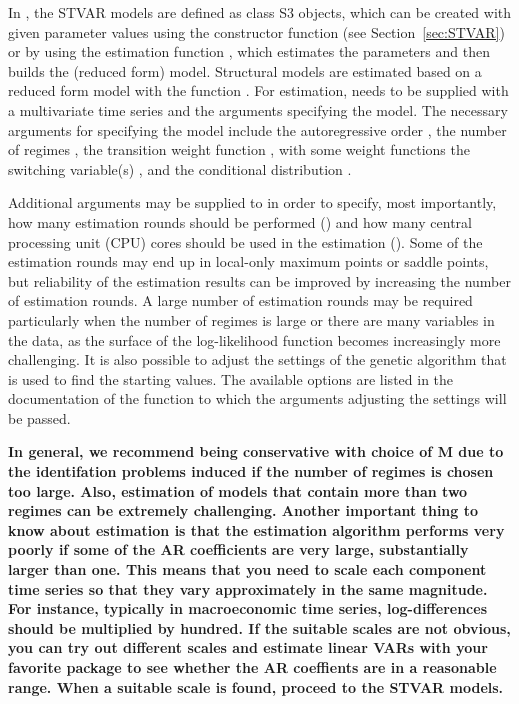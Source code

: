 \documentclass[nojss]{jss}
\begin{document}
In , the STVAR models are defined as class  S3 objects, which can be created with given parameter values using the constructor function  (see Section~\ref{sec:STVAR}) or by using the estimation function , which estimates the parameters and then builds the (reduced form) model. Structural models are estimated based on a reduced form model with the function . For estimation,  needs to be supplied with a multivariate time series and the arguments specifying the model. The necessary arguments for specifying the model include the autoregressive order , the number of regimes , the transition weight function , with some weight functions the switching variable(s) , and the conditional distribution .

Additional arguments may be supplied to  in order to specify, most importantly, how many estimation rounds should be performed () and how many central processing unit (CPU) cores should be used in the estimation (). Some of the estimation rounds may end up in local-only maximum points or saddle points, but reliability of the estimation results can be improved by increasing the number of estimation rounds. A large number of estimation rounds may be required particularly when the number of regimes is large or there are many variables in the data, as the surface of the log-likelihood function becomes increasingly more challenging. It is also possible to adjust the settings of the genetic algorithm that is used to find the starting values. The available options are listed in the documentation of the function  to which the arguments adjusting the settings will be passed.

\textbf{In general, we recommend being conservative with choice of M due to the identifation problems induced if the number of regimes is chosen too large. Also, estimation of models that contain more than two regimes can be extremely challenging. Another important thing to know about estimation is that the estimation algorithm performs very poorly if some of the AR coefficients are very large, substantially larger than one. This means that you need to scale each component time series so that they vary approximately in the same magnitude. For instance, typically in macroeconomic time series, log-differences should be multiplied by hundred. If the suitable scales are not obvious, you can try out different scales and estimate linear VARs with your favorite package to see whether the AR coeffients are in a reasonable range. When a suitable scale is found, proceed to the STVAR models.}
\end{document}
